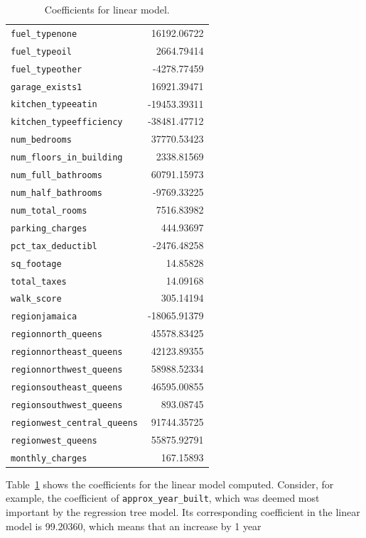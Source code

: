 \documentclass[11pt]{article}
\begin{document}
\begin{table}
\begin{tabular}{|l|r|}
			\verb|fuel_typenone| &	16192.06722			\\
			\verb|fuel_typeoil| & 	2664.79414			\\
			\verb|fuel_typeother| &	-4278.77459			\\
			\verb|garage_exists1| &	16921.39471			\\
			\verb|kitchen_typeeatin| & -19453.39311	\\		
			\verb|kitchen_typeefficiency| & -38481.47712\\			
			\verb|num_bedrooms| & 37770.53423			\\
			\verb|num_floors_in_building| & 2338.81569	\\
			\verb|num_full_bathrooms| &	60791.15973			\\
			\verb|num_half_bathrooms| &	-9769.33225			\\
			\verb|num_total_rooms|	& 7516.83982			\\
			\verb|parking_charges|	& 444.93697			\\
			\verb|pct_tax_deductibl| & -2476.48258		\\	
			\verb|sq_footage|	& 14.85828			\\
			\verb|total_taxes|	& 14.09168			\\
			\verb|walk_score|	& 305.14194			\\
			\verb|regionjamaica| & -18065.91379	\\		
			\verb|regionnorth_queens| & 45578.83425	\\
			\verb|regionnortheast_queens| & 	42123.89355		\\	
			\verb|regionnorthwest_queens| & 	58988.52334		\\	
			\verb|regionsoutheast_queens| &	46595.00855		\\	
			\verb|regionsouthwest_queens| &	893.08745		\\	
			\verb|regionwest_central_queens| &	91744.35725	\\		
			\verb|regionwest_queens| &	55875.92791			\\
			\verb|monthly_charges| &	167.15893	\\
			\hline
		\end{tabular}
		\caption{Coefficients for linear model.}
		\label{tbl:coeffs-linear-mod}
	\end{table}
	Table~\ref{tbl:coeffs-linear-mod} shows the coefficients for
	the linear model computed. Consider, for example, the coefficient
	of \verb|approx_year_built|, which was deemed most important by
	the regression tree model. Its corresponding coefficient in
	the linear model is 99.20360, which means that an increase by 1 year
\end{document}
